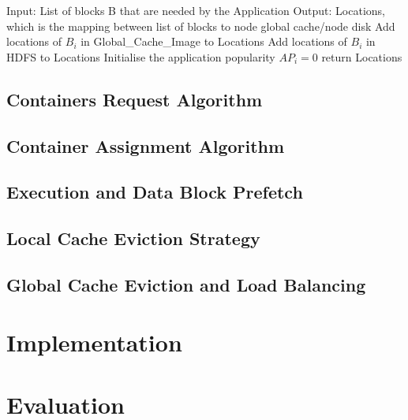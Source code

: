 \documentclass[print,ms]{nuthesis}%
\begin{document}
 
\begin{algorithm}[tbh]%
\caption{}\label{euclid}
\begin{algorithmic}[1]
\State Input: List of blocks B that are needed by the Application
\State Output: Locations, which is the mapping between list of blocks to node global cache/node disk   
 \State Add locations of $B_i$ in Global\_Cache\_Image to Locations
\State Add locations of $B_i$ in HDFS to Locations
\State Initialise the application popularity $AP_i = 0$
\EndFor
return Locations
\EndProcedure
\end{algorithmic}
\end{algorithm}

\section{Containers Request Algorithm}


\section{Container Assignment Algorithm}


\section{Execution and Data Block Prefetch}


\section{Local Cache Eviction Strategy}

\section{Global Cache Eviction and Load Balancing}

\newpage
\chapter{Implementation}

\newpage
\chapter{Evaluation}
\end{document}
